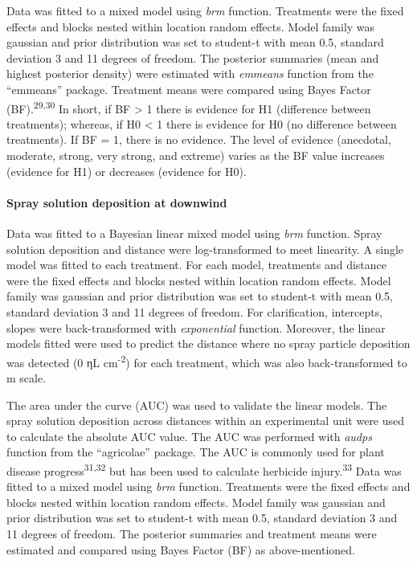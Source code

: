 \documentclass[
  12pt,
  a4paper,
]{article}
\begin{document}
Data was fitted to a mixed model using \emph{brm} function. Treatments
were the fixed effects and blocks nested within location random effects.
Model family was gaussian and prior distribution was set to student-t
with mean 0.5, standard deviation 3 and 11 degrees of freedom. The
posterior summaries (mean and highest posterior density) were estimated
with \emph{emmeans} function from the ``emmeans'' package. Treatment
means were compared using Bayes Factor (BF).\textsuperscript{29,30} In
short, if BF \textgreater{} 1 there is evidence for H1 (difference
between treatments); whereas, if H0 \textless{} 1 there is evidence for
H0 (no difference between treatments). If BF = 1, there is no evidence.
The level of evidence (anecdotal, moderate, strong, very strong, and
extreme) varies as the BF value increases (evidence for H1) or decreases
(evidence for H0).

\hypertarget{spray-solution-deposition-at-downwind}{%
\paragraph{Spray solution deposition at
downwind}\label{spray-solution-deposition-at-downwind}}

Data was fitted to a Bayesian linear mixed model using \emph{brm}
function. Spray solution deposition and distance were log-transformed to
meet linearity. A single model was fitted to each treatment. For each
model, treatments and distance were the fixed effects and blocks nested
within location random effects. Model family was gaussian and prior
distribution was set to student-t with mean 0.5, standard deviation 3
and 11 degrees of freedom. For clarification, intercepts, slopes were
back-transformed with \emph{exponential} function. Moreover, the linear
models fitted were used to predict the distance where no spray particle
deposition was detected (0 ηL cm\textsuperscript{-2}) for each
treatment, which was also back-transformed to m scale.

The area under the curve (AUC) was used to validate the linear models.
The spray solution deposition across distances within an experimental
unit were used to calculate the absolute AUC value. The AUC was
performed with \emph{audps} function from the ``agricolae'' package. The
AUC is commonly used for plant disease progress\textsuperscript{31,32}
but has been used to calculate herbicide injury.\textsuperscript{33}
Data was fitted to a mixed model using \emph{brm} function. Treatments
were the fixed effects and blocks nested within location random effects.
Model family was gaussian and prior distribution was set to student-t
with mean 0.5, standard deviation 3 and 11 degrees of freedom. The
posterior summaries and treatment means were estimated and compared
using Bayes Factor (BF) as above-mentioned.
\end{document}

